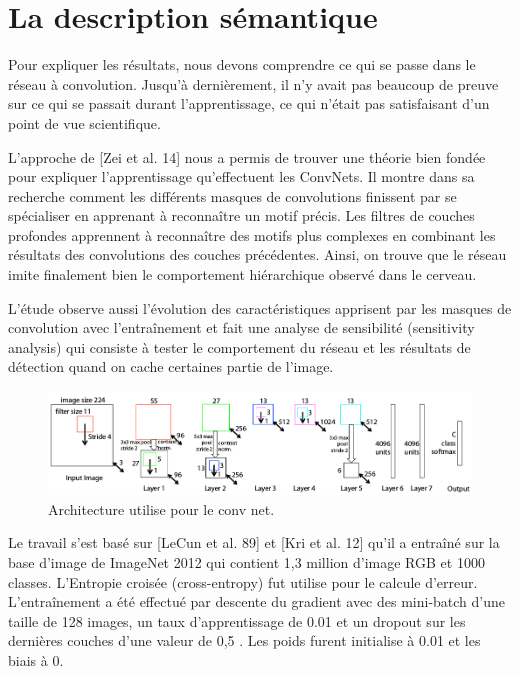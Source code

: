 \section{La description sémantique}

Pour expliquer les résultats, nous devons comprendre ce qui se passe dans le réseau à convolution. Jusqu’à dernièrement, il n'y avait pas beaucoup de preuve sur ce qui se passait durant l'apprentissage, ce qui n’était pas satisfaisant d'un point de vue scientifique.


L'approche de [Zei et al. 14] nous a permis de trouver une théorie bien fondée pour expliquer l'apprentissage qu'effectuent les ConvNets. Il montre dans sa recherche comment les différents masques de convolutions finissent par se spécialiser en apprenant à reconnaître un motif précis. Les filtres de couches profondes apprennent à reconnaître des motifs plus complexes en combinant les résultats des convolutions des couches précédentes.
Ainsi, on trouve que le réseau imite finalement bien le comportement hiérarchique observé dans le cerveau.


L’étude observe aussi l’évolution des caractéristiques apprisent par les masques de convolution avec l’entraînement et fait une analyse de sensibilité (sensitivity analysis) qui consiste à tester le comportement du réseau et les résultats de détection quand on cache certaines partie de l'image.

\begin{figure}[H]
	\centering
		\includegraphics[width=5in]{Figures/arch.png}
	\caption[Res]{Architecture utilise pour le conv net.}
	\label{fig:Electron}
\end{figure}


Le travail s'est basé sur [LeCun et al. 89] et [Kri et al. 12] qu'il a entraîné sur la base d'image de ImageNet 2012 qui contient 1,3 million d'image RGB et 1000 classes. L'Entropie croisée (cross-entropy) fut utilise pour le calcule d'erreur. L’entraînement a été effectué par descente du gradient avec des mini-batch d'une taille de 128 images, un taux d'apprentissage de 0.01 et un dropout sur les dernières couches d'une valeur de 0,5 . Les poids furent initialise à 0.01 et les biais à 0.


